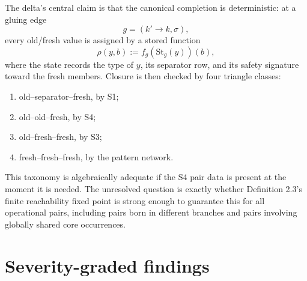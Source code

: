 \documentclass[11pt]{article}
\newcommand{\St}{\ensuremath{\mathrm{St}}}
\begin{document}
The delta's central claim is that the canonical completion is deterministic: at a gluing edge
\[
  g=(k' \to k,\sigma),
\]
every old/fresh value is assigned by a stored function
\[
  \rho(y,b) := f_g(\St_g(y))(b),
\]
where the state records the type of \(y\), its separator row, and its safety signature toward the fresh members.  Closure is then checked by four triangle classes:
\begin{enumerate}[label=\roman*.]
  \item old--separator--fresh, by S1;
  \item old--old--fresh, by S4;
  \item old--fresh--fresh, by S3;
  \item fresh--fresh--fresh, by the pattern network.
\end{enumerate}
This taxonomy is algebraically adequate if the S4 pair data is present at the moment it is needed.  The unresolved question is exactly whether Definition 2.3's finite reachability fixed point is strong enough to guarantee this for all operational pairs, including pairs born in different branches and pairs involving globally shared core occurrences.

\section{Severity-graded findings}
\end{document}
